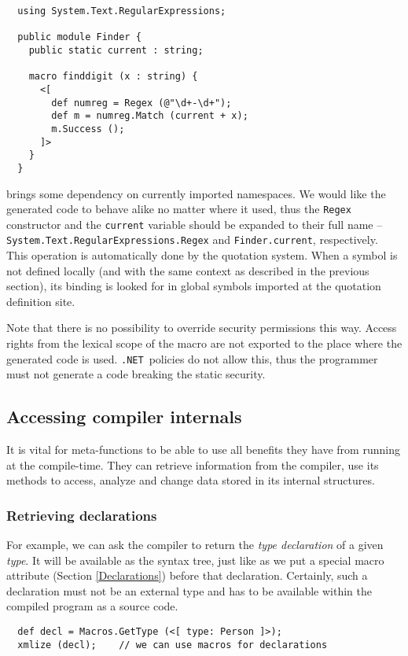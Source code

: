 \documentclass{llncs}
\newcommand{\net}[0]{{\tt .NET}}
\begin{document}
\begin{verbatim}
  using System.Text.RegularExpressions;

  public module Finder {
    public static current : string;

    macro finddigit (x : string) {
      <[ 
        def numreg = Regex (@"\d+-\d+");
        def m = numreg.Match (current + x);
        m.Success ();
      ]>
    }
  }
\end{verbatim} %

\noindent
brings some dependency on currently imported namespaces. We would like the
generated code to behave alike no matter where it used, thus the
\verb,Regex, constructor and the \verb,current, variable should be expanded to
their full name -- \verb,System.Text.RegularExpressions.Regex,
and \verb,Finder.current,, respectively. This operation is automatically
done by the quotation system. When a symbol is not defined locally (and with 
the same context as described in the previous section), its binding is 
looked for in global symbols imported at the quotation definition site.

Note that there is no possibility to override security permissions this
way. Access rights from the lexical scope of the macro are not exported to 
the place where the generated code is used. \net\ policies do not allow this, 
thus the programmer must not generate a code breaking the static security.

\subsection{Accessing compiler internals}
It is vital for meta-functions to be able to use all benefits they have
from running at the compile-time. They can retrieve information from the
compiler, use its methods to access, analyze and change data stored
in its internal structures. 

\subsubsection{Retrieving declarations}
For example, we can ask the compiler to return the \emph{type declaration} 
of a given \emph{type}. It will be available as the syntax tree, just like 
as we put a special macro attribute (Section \ref{Declarations}) before that declaration.
Certainly, such a declaration must not be an external type 
and has to be available within the compiled program as a source code.

\begin{verbatim}
  def decl = Macros.GetType (<[ type: Person ]>);
  xmlize (decl);    // we can use macros for declarations
\end{verbatim}
\end{document}

